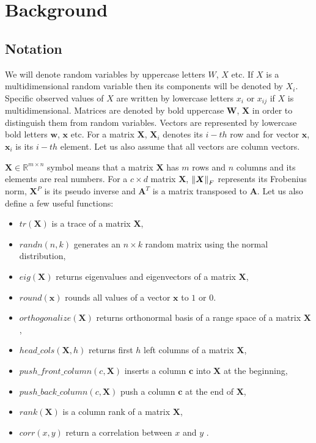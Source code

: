 
\chapter{Background}
\section{Notation}

We will denote random variables by uppercase letters $W$, $X$ etc. If $X$ is a multidimensional random variable then its components will be denoted by $X_i$. Specific observed values of $X$ are written by lowercase letters $x_i$ or $x_{ij}$ if $X$ is multidimensional. Matrices are denoted by bold uppercase $\boldsymbol{W}$, $\boldsymbol{X}$ in order to distinguish them from random variables. Vectors are represented by lowercase bold letters $\boldsymbol{w}$, $\boldsymbol{x}$ etc. For a matrix $\boldsymbol{X}$, $\boldsymbol{X}_{i}$ denotes its $i-th$ row and for vector $\boldsymbol{x}$, $\boldsymbol{x}_i$ is its $i-th$ element. Let us also assume that all vectors are column vectors. 

$\boldsymbol{X} \in \mathbb{R}^{m \times n}$ symbol means that a matrix $\boldsymbol{X}$ has $m$ rows and $n$ columns and its elements are real numbers. For a $c \times d$  matrix $\boldsymbol{X}$, $\left\lVert\boldsymbol{X}\right\rVert_{F}$ represents its Frobenius norm, $\boldsymbol{X}^P$ is its pseudo inverse and $\boldsymbol{A}^T$ is a matrix transposed to $\boldsymbol{A}$. 
Let us also define a few useful functions:
\begin{itemize}
\item $tr(\boldsymbol{X})$ is a trace of a matrix $\boldsymbol{X}$, 
\item $randn(n,k)$ generates an $n \times k$ random matrix using the normal distribution,
\item $eig(\boldsymbol{X})$ returns eigenvalues and eigenvectors of a matrix $\boldsymbol{X}$,
\item $round(\boldsymbol{x})$ rounds all values of a vector $\boldsymbol{x}$ to $1$ or $0$.
\item $orthogonalize(\boldsymbol{X})$ returns orthonormal basis of a range space of a matrix $\boldsymbol{X}$,
\item $head\_cols(\boldsymbol{X},h)$ returns first $h$ left columns of a matrix $\boldsymbol{X}$,
\item $push\_front\_column(c,\boldsymbol{X})$ inserts a column $\boldsymbol{c}$ into $\boldsymbol{X}$ at the beginning,
\item $push\_back\_column(c,\boldsymbol{X})$ push a column $\boldsymbol{c}$ at the end of $\boldsymbol{X}$,
\item $rank(\boldsymbol{X})$ is a column rank of a matrix $\boldsymbol{X}$,
\item $corr(x,y)$ return a correlation between $x$ and $y$ . 

\end{itemize}


